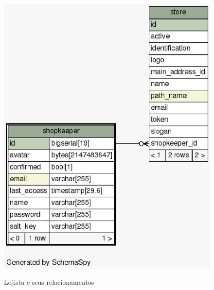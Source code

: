 \documentclass[a4paper,12pt]{monografia}
\begin{document}
\begin{figure}[H]
\centering
\caption{Lojista e seus relacionamentos}
\centering
\includegraphics[scale=0.7]{img/diagramas/schema/shopkeeper.1degree.png.eps}\\
\end{figure}
\end{document}
